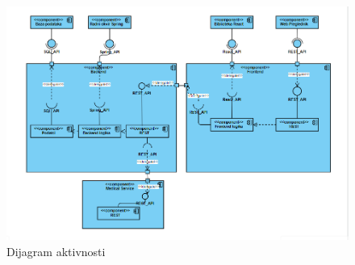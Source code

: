 			\begin{figure}[H]
				\includegraphics[width=\textwidth]{slike/dijagram_komponenti.png}
				\centering
				\caption{Dijagram aktivnosti}
				\label{fig:dijagram-komponenti}
			\end{figure}